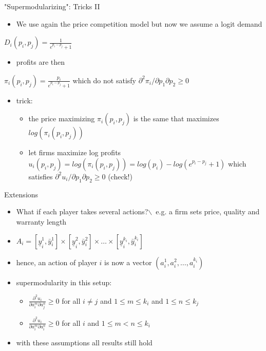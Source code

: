 \documentclass[bigger]{beamer}
\begin{document}
\begin{frame}[label={sec:orgheadline17}]{"Supermodularizing": Tricks II}
\begin{itemize}
\item We use again the price competition model but now we assume a logit demand
\end{itemize}
\(D_i(p_i,p_j)=\frac{1}{e^{p_i-p_j}+1}\)
\begin{itemize}
\item profits are then
\end{itemize}
\(\pi_i(p_i,p_j)=\frac{p_i}{e^{p_i-p_j}+1}\)
which do not satisfy \(\partial^2 \pi_i/\partial p_1\partial p_2\geq 0\)
\begin{itemize}
\item trick:
\begin{itemize}
\item the price maximizing \(\pi_i(p_i,p_j)\) is the same that maximizes \(log(\pi_i(p_i,p_j))\)
\item let firms maximize log profits \(u_i(p_i,p_j)=log (\pi_i(p_i,p_j))= log(p_i)-log(e^{p_i-p_j}+1)\) which satisfies \(\partial^2 u_i/\partial p_1\partial p_2\geq 0\) (check!)
\end{itemize}
\end{itemize}
\end{frame}

\begin{frame}[label={sec:orgheadline18}]{Extensions}
\begin{itemize}
\item What if each player takes several actions?$\backslash$\ e.g. a firm sets price, quality and warranty length
\item \(A_i=[\underline y_i^1,\bar y_i^1]\times [\underline y_i^2,\bar y_i^2]\times \dots \times [\underline y_i^{k_i},\bar y_i^{k_i}]\)
\item hence, an action of player \(i\) is now a vector \((a_i^1,a_i^2,\dots,a_i^{k_i})\)
\item supermodularity in this setup:
\begin{itemize}
\item \(\frac{\partial^2 u_i}{\partial a_i^m \partial a_j^n}\geq 0\) for all \(i\neq j\) and \(1\leq m\leq k_i\) and \(1\leq n\leq k_j\)
\item \(\frac{\partial^2 u_i}{\partial a_i^m \partial a_i^n}\geq0\) for all \(i\) and \(1\leq m< n\leq k_i\)
\end{itemize}
\item with these assumptions all results still hold
\end{itemize}
\end{frame}
\end{document}
